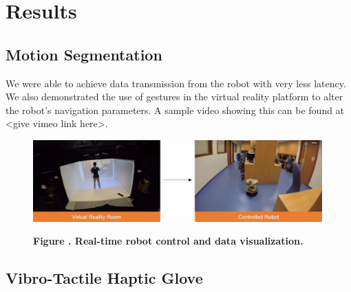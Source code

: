 \chapter{Results }
\section{Motion Segmentation}
We were able to achieve data transmission from the robot with very less latency. We also demonstrated the use of gestures in the virtual reality platform to alter the robot's navigation parameters. A sample video showing this can be found at <give vimeo link here>.
\begin{figure}[h!]
	\begin{center}
		\includegraphics[width=0.99\textwidth]{figures/motion-seg/result}%
	\end{center}
	\textbf{\label{fig:result-motion} Figure . Real-time robot control and data visualization.} { }
\end{figure}
\section{Vibro-Tactile Haptic Glove}

